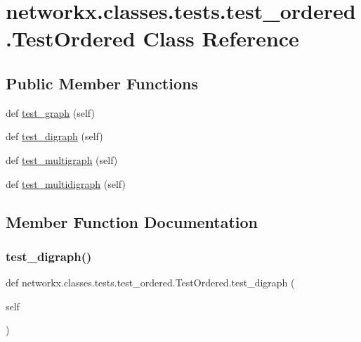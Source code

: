 \hypertarget{classnetworkx_1_1classes_1_1tests_1_1test__ordered_1_1TestOrdered}{}\section{networkx.\+classes.\+tests.\+test\+\_\+ordered.\+Test\+Ordered Class Reference}
\label{classnetworkx_1_1classes_1_1tests_1_1test__ordered_1_1TestOrdered}
\subsection*{Public Member Functions}
\begin{DoxyCompactItemize}
\item 
def \hyperlink{classnetworkx_1_1classes_1_1tests_1_1test__ordered_1_1TestOrdered_a89e668fdd4e20c49e67d8d62334da30f}{test\+\_\+graph} (self)
\item 
def \hyperlink{classnetworkx_1_1classes_1_1tests_1_1test__ordered_1_1TestOrdered_ae1e881ee25036b489230c224125819c1}{test\+\_\+digraph} (self)
\item 
def \hyperlink{classnetworkx_1_1classes_1_1tests_1_1test__ordered_1_1TestOrdered_abe315176b2c0d1e91393b4d9aee6e6b2}{test\+\_\+multigraph} (self)
\item 
def \hyperlink{classnetworkx_1_1classes_1_1tests_1_1test__ordered_1_1TestOrdered_a4a06ea11af3aab7c6334fadde85c2f86}{test\+\_\+multidigraph} (self)
\end{DoxyCompactItemize}


\subsection{Member Function Documentation}
\mbox{\label{classnetworkx_1_1classes_1_1tests_1_1test__ordered_1_1TestOrdered_ae1e881ee25036b489230c224125819c1}} 
\subsubsection{\texorpdfstring{test\+\_\+digraph()}{test\_digraph()}}
{\footnotesize\ttfamily def networkx.\+classes.\+tests.\+test\+\_\+ordered.\+Test\+Ordered.\+test\+\_\+digraph (\begin{DoxyParamCaption}\item[{}]{self }\end{DoxyParamCaption})}

